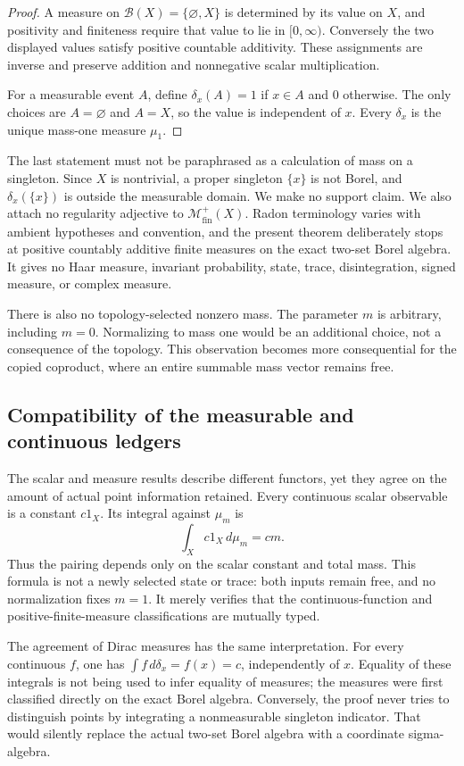 \documentclass[11pt]{article}
\theoremstyle{definition}
\newcommand{\Borel}{\mathcal B}
\newcommand{\Mfin}{\mathcal M_{\mathrm{fin}}^+}
\begin{document}
\begin{proof}
A measure on $\Borel(X)=\{\varnothing,X\}$ is determined by its value on $X$, and positivity and finiteness require that value to lie in $[0,\infty)$.  Conversely the two displayed values satisfy positive countable additivity.  These assignments are inverse and preserve addition and nonnegative scalar multiplication.

For a measurable event $A$, define $\delta_x(A)=1$ if $x\in A$ and $0$ otherwise.  The only choices are $A=\varnothing$ and $A=X$, so the value is independent of $x$.  Every $\delta_x$ is the unique mass-one measure $\mu_1$.
\end{proof}

The last statement must not be paraphrased as a calculation of mass on a singleton.  Since $X$ is nontrivial, a proper singleton $\{x\}$ is not Borel, and $\delta_x(\{x\})$ is outside the measurable domain.  We make no support claim.  We also attach no regularity adjective to $\Mfin(X)$.  Radon terminology varies with ambient hypotheses and convention, and the present theorem deliberately stops at positive countably additive finite measures on the exact two-set Borel algebra.  It gives no Haar measure, invariant probability, state, trace, disintegration, signed measure, or complex measure.

There is also no topology-selected nonzero mass.  The parameter $m$ is arbitrary, including $m=0$.  Normalizing to mass one would be an additional choice, not a consequence of the topology.  This observation becomes more consequential for the copied coproduct, where an entire summable mass vector remains free.

\subsection{Compatibility of the measurable and continuous ledgers}

The scalar and measure results describe different functors, yet they agree on the amount of actual point information retained.  Every continuous scalar observable is a constant $c1_X$.  Its integral against $\mu_m$ is
\[
 \int_X c1_X\,d\mu_m=cm.
\]
Thus the pairing depends only on the scalar constant and total mass.  This formula is not a newly selected state or trace: both inputs remain free, and no normalization fixes $m=1$.  It merely verifies that the continuous-function and positive-finite-measure classifications are mutually typed.

The agreement of Dirac measures has the same interpretation.  For every continuous $f$, one has $\int f\,d\delta_x=f(x)=c$, independently of $x$.  Equality of these integrals is not being used to infer equality of measures; the measures were first classified directly on the exact Borel algebra.  Conversely, the proof never tries to distinguish points by integrating a nonmeasurable singleton indicator.  That would silently replace the actual two-set Borel algebra with a coordinate sigma-algebra.
\end{document}
